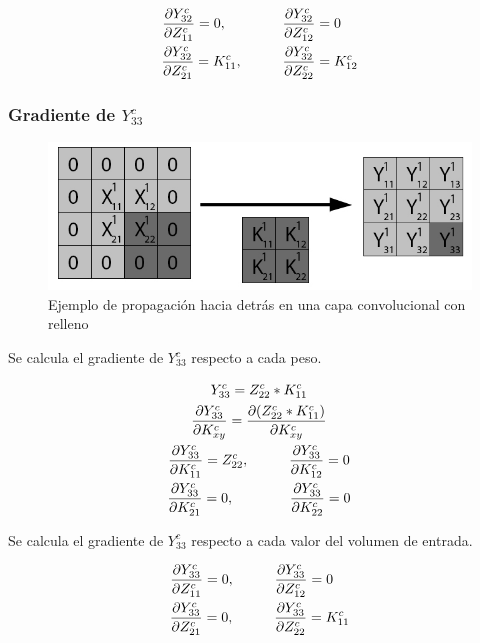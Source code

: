\begin{gather}
	\frac{\partial Y^c_{32}}{\partial Z^c_{11}} = 0, \hspace{14mm} \frac{\partial Y^c_{32}}{\partial Z^c_{12}} = 0 \hspace{4mm}\\
	\frac{\partial Y^c_{32}}{\partial Z^c_{21}} = K^c_{11}, \hspace{10mm} \frac{\partial Y^c_{32}}{\partial Z^c_{22}} = K^c_{12}
\end{gather}



\subsubsection{Gradiente de $Y^c_{33}$}

\begin{figure}[H]
	\centering
	\includegraphics[width=0.8\linewidth]{imagenes/conv_back_padding_9.jpg} 
	\caption{Ejemplo de propagación hacia detrás en una capa convolucional con relleno}
\end{figure}

Se calcula el gradiente de $Y^c_{33}$ respecto a cada peso.

\begin{gather}
	Y^c_{33} = Z^c_{22} * K^c_{11} \\
	\frac{\partial Y^c_{33}}{\partial K^c_{xy}} = \frac{\partial (Z^c_{22} * K^c_{11})}{\partial K^c_{xy}} \\
	\frac{\partial Y^c_{33}}{\partial K^c_{11}} = Z^c_{22}, \hspace{10mm} \frac{\partial Y^c_{33}}{\partial K^c_{12}} = 0 \\
	\frac{\partial Y^c_{33}}{\partial K^c_{21}} = 0, \hspace{14mm} \frac{\partial Y^c_{33}}{\partial K^c_{22}} = 0 
\end{gather}

Se calcula el gradiente de $Y^c_{33}$ respecto a cada valor del volumen de entrada.

\begin{gather}
	\frac{\partial Y^c_{33}}{\partial Z^c_{11}} = 0, \hspace{10mm} \frac{\partial Y^c_{33}}{\partial Z^c_{12}} = 0 \hspace{4mm}\\
	\frac{\partial Y^c_{33}}{\partial Z^c_{21}} = 0, \hspace{10mm} \frac{\partial Y^c_{33}}{\partial Z^c_{22}} = K^c_{11}
\end{gather}



